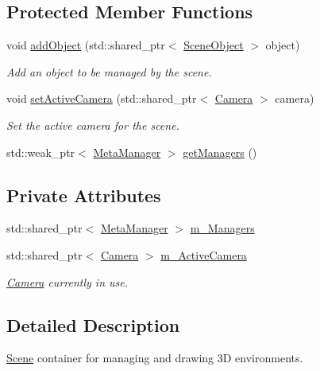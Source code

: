 \subsection*{Protected Member Functions}
\begin{DoxyCompactItemize}
\item 
void \hyperlink{class_scene_a4f683b6add0466a6b3fa1357fc27baa3}{add\+Object} (std\+::shared\+\_\+ptr$<$ \hyperlink{class_scene_object}{Scene\+Object} $>$ object)
\begin{DoxyCompactList}\small\item\em Add an object to be managed by the scene. \end{DoxyCompactList}\item 
void \hyperlink{class_scene_a8822b7f23dbd84390024545192779516}{set\+Active\+Camera} (std\+::shared\+\_\+ptr$<$ \hyperlink{class_camera}{Camera} $>$ camera)
\begin{DoxyCompactList}\small\item\em Set the active camera for the scene. \end{DoxyCompactList}\item 
std\+::weak\+\_\+ptr$<$ \hyperlink{class_meta_manager}{Meta\+Manager} $>$ \hyperlink{class_scene_ae0da6dc6945a84f338a4d1907fef0dbc}{get\+Managers} ()
\end{DoxyCompactItemize}
\subsection*{Private Attributes}
\begin{DoxyCompactItemize}
\item 
std\+::shared\+\_\+ptr$<$ \hyperlink{class_meta_manager}{Meta\+Manager} $>$ \hyperlink{class_scene_a40f1ffc374bb488c2ec2599289793316}{m\+\_\+\+Managers}
\item 
std\+::shared\+\_\+ptr$<$ \hyperlink{class_camera}{Camera} $>$ \hyperlink{class_scene_a14eae4c46620f2eac7f3efcc8a8ec0e2}{m\+\_\+\+Active\+Camera}
\begin{DoxyCompactList}\small\item\em \hyperlink{class_camera}{Camera} currently in use. \end{DoxyCompactList}\end{DoxyCompactItemize}


\subsection{Detailed Description}
\hyperlink{class_scene}{Scene} container for managing and drawing 3D environments. 

